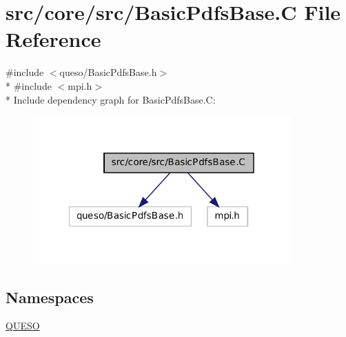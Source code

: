 \hypertarget{_basic_pdfs_base_8_c}{\section{src/core/src/\-Basic\-Pdfs\-Base.C File Reference}
\label{_basic_pdfs_base_8_c}
}
{\ttfamily \#include $<$queso/\-Basic\-Pdfs\-Base.\-h$>$}\\*
{\ttfamily \#include $<$mpi.\-h$>$}\\*
Include dependency graph for Basic\-Pdfs\-Base.\-C\-:
\nopagebreak
\begin{figure}[H]
\begin{center}
\leavevmode
\includegraphics[width=280pt]{_basic_pdfs_base_8_c__incl}
\end{center}
\end{figure}
\subsection*{Namespaces}
\begin{DoxyCompactItemize}
\item 
\hyperlink{namespace_q_u_e_s_o}{Q\-U\-E\-S\-O}
\end{DoxyCompactItemize}
